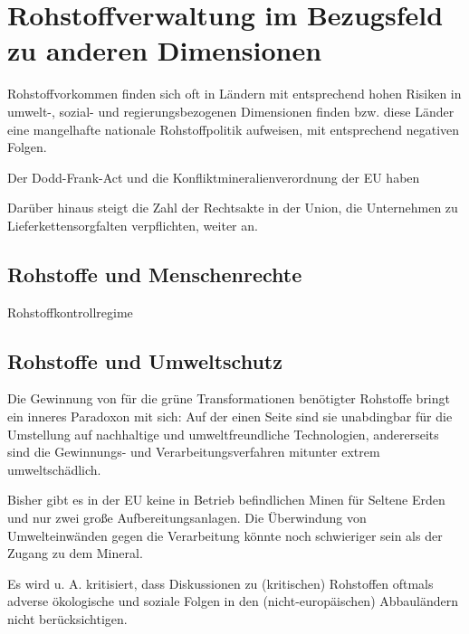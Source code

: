 \documentclass[12pt,a4paper,oneside]{book} %
\begin{document}
	
\chapter{Rohstoffverwaltung im Bezugsfeld zu anderen Dimensionen}

Rohstoffvorkommen finden sich oft in Ländern mit entsprechend hohen Risiken in umwelt-, sozial- und regierungsbezogenen Dimensionen finden\autocite{The social and environmental complexities of extracting energy transition metals} bzw. diese Länder eine mangelhafte nationale Rohstoffpolitik aufweisen, mit entsprechend negativen Folgen.\autocite{Sustainable energy transitions require enhanced resource governance}

Der Dodd-Frank-Act und die Konfliktmineralienverordnung der EU haben 

Darüber hinaus steigt die Zahl der Rechtsakte in der Union, die Unternehmen zu Lieferkettensorgfalten verpflichten, weiter an.


\section{Rohstoffe und Menschenrechte}

Rohstoffkontrollregime

\section{Rohstoffe und Umweltschutz}

Die Gewinnung von für die grüne Transformationen benötigter Rohstoffe bringt ein inneres Paradoxon mit sich: Auf der einen Seite sind sie unabdingbar für die Umstellung auf nachhaltige und umweltfreundliche Technologien, andererseits sind die Gewinnungs- und Verarbeitungsverfahren mitunter extrem umweltschädlich.\autocite{https://www.actu-environnement.com/ae/news/interview-christian-hocquard-terres-rares-applications-environnementales-impact-chine-10352.php4}

Bisher gibt es in der EU keine in Betrieb befindlichen Minen für Seltene Erden und nur zwei große Aufbereitungsanlagen. Die Überwindung von Umwelteinwänden gegen die Verarbeitung könnte noch schwieriger sein als der Zugang zu dem Mineral. 

Es wird u. A. kritisiert, dass Diskussionen zu (kritischen) Rohstoffen oftmals adverse ökologische und soziale Folgen in den (nicht-europäischen) Abbauländern nicht berücksichtigen.\autocite[15]{Kueblboeck_2023}
\end{document}
